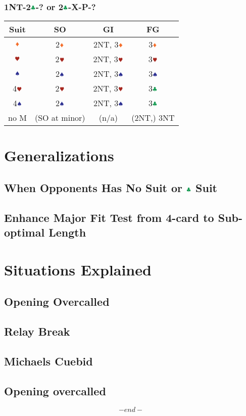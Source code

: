 \documentclass{article}
\newcommand*{\ccc}{\textcolor{ForestGreen}{\clubsuit}}
\newcommand*{\ddd}{\textcolor{Orange}{\vardiamondsuit}}
\newcommand*{\hhh}{\textcolor{Mahogany}{\varheartsuit}}
\newcommand*{\sss}{\textcolor{Blue}{\spadesuit}}
\begin{document}
\begin{multicols}{2}
\subsubsection{1NT-2$\ccc$-? or 2$\ccc$-X-P-?}
\begin{tabular}{|c|c|c|c|}
    \hline
    Suit & SO & GI & FG \\ \hline
    $\ddd$ & 2$\ddd$ & 2NT, 3$\ddd$ & 3$\ddd$ \\ \hline
    $\hhh$ & 2$\hhh$ & 2NT, 3$\hhh$ & 3$\hhh$ \\ \hline
    $\sss$ & 2$\sss$ & 2NT, 3$\sss$ & 3$\sss$ \\ \hline
    4$\hhh$ & 2$\hhh$ & 2NT, 3$\hhh$ & 3$\ccc$ \\ \hline
    4$\sss$ & 2$\sss$ & 2NT, 3$\sss$ & 3$\ccc$ \\ \hline
    no M & (SO at minor) & (n/a) & (2NT,) 3NT \\ \hline
\end{tabular}

\section{Generalizations}
\subsection{When Opponents Has No Suit or $\ccc$ Suit}

\subsection{Enhance Major Fit Test from 4-card to Sub-optimal Length}

\section{Situations Explained}
\subsection{Opening Overcalled}
\subsection{Relay Break}
\subsection{Michaels Cuebid}
\subsection{Opening overcalled}

\columnbreak
$$ -end- $$

\end{multicols}
\end{document}
